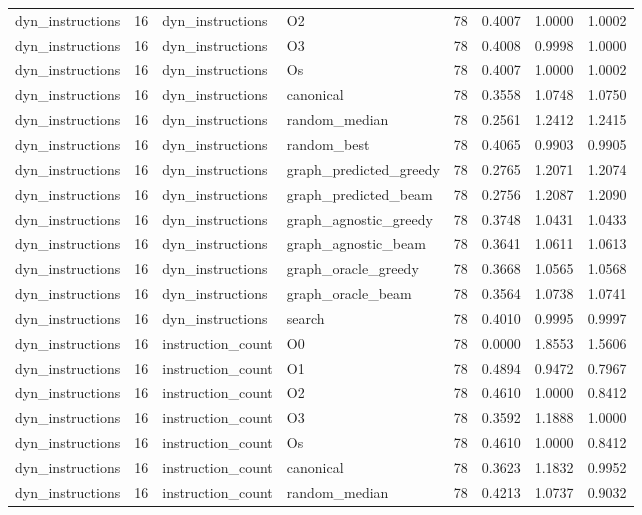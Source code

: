 \begin{table}[t]
\begin{tabular}{lrllrrrr}
dyn\_instructions & 16 & dyn\_instructions & O2 & 78 & 0.4007 & 1.0000 & 1.0002 \\
dyn\_instructions & 16 & dyn\_instructions & O3 & 78 & 0.4008 & 0.9998 & 1.0000 \\
dyn\_instructions & 16 & dyn\_instructions & Os & 78 & 0.4007 & 1.0000 & 1.0002 \\
dyn\_instructions & 16 & dyn\_instructions & canonical & 78 & 0.3558 & 1.0748 & 1.0750 \\
dyn\_instructions & 16 & dyn\_instructions & random\_median & 78 & 0.2561 & 1.2412 & 1.2415 \\
dyn\_instructions & 16 & dyn\_instructions & random\_best & 78 & 0.4065 & 0.9903 & 0.9905 \\
dyn\_instructions & 16 & dyn\_instructions & graph\_predicted\_greedy & 78 & 0.2765 & 1.2071 & 1.2074 \\
dyn\_instructions & 16 & dyn\_instructions & graph\_predicted\_beam & 78 & 0.2756 & 1.2087 & 1.2090 \\
dyn\_instructions & 16 & dyn\_instructions & graph\_agnostic\_greedy & 78 & 0.3748 & 1.0431 & 1.0433 \\
dyn\_instructions & 16 & dyn\_instructions & graph\_agnostic\_beam & 78 & 0.3641 & 1.0611 & 1.0613 \\
dyn\_instructions & 16 & dyn\_instructions & graph\_oracle\_greedy & 78 & 0.3668 & 1.0565 & 1.0568 \\
dyn\_instructions & 16 & dyn\_instructions & graph\_oracle\_beam & 78 & 0.3564 & 1.0738 & 1.0741 \\
dyn\_instructions & 16 & dyn\_instructions & search & 78 & 0.4010 & 0.9995 & 0.9997 \\
dyn\_instructions & 16 & instruction\_count & O0 & 78 & 0.0000 & 1.8553 & 1.5606 \\
dyn\_instructions & 16 & instruction\_count & O1 & 78 & 0.4894 & 0.9472 & 0.7967 \\
dyn\_instructions & 16 & instruction\_count & O2 & 78 & 0.4610 & 1.0000 & 0.8412 \\
dyn\_instructions & 16 & instruction\_count & O3 & 78 & 0.3592 & 1.1888 & 1.0000 \\
dyn\_instructions & 16 & instruction\_count & Os & 78 & 0.4610 & 1.0000 & 0.8412 \\
dyn\_instructions & 16 & instruction\_count & canonical & 78 & 0.3623 & 1.1832 & 0.9952 \\
dyn\_instructions & 16 & instruction\_count & random\_median & 78 & 0.4213 & 1.0737 & 0.9032 \\

\end{tabular}
\end{table}

